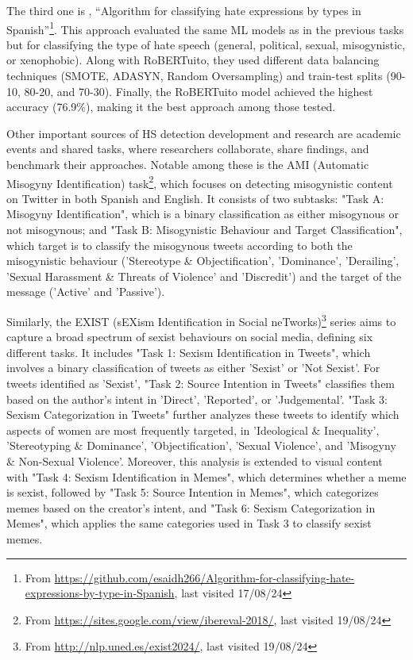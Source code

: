 The third one is \cite{perez-2024}, “Algorithm for classifying hate expressions by types in Spanish”\footnote{From \url{https://github.com/esaidh266/Algorithm-for-classifying-hate-expressions-by-type-in-Spanish}, last visited 17/08/24}. This approach evaluated the same ML models as in the previous tasks but for classifying the type of hate speech (general, political, sexual, misogynistic, or xenophobic). Along with RoBERTuito, they used different data balancing techniques (SMOTE, ADASYN, Random Oversampling) and train-test splits (90-10, 80-20, and 70-30). Finally, the RoBERTuito model achieved the highest accuracy (76.9\%), making it the best approach among those tested.

Other important sources of HS detection development and research are academic events and shared tasks, where researchers collaborate, share findings, and benchmark their approaches. Notable among these is the AMI (Automatic Misogyny Identification) task\footnote{From \url{https://sites.google.com/view/ibereval-2018/}, last visited 19/08/24}, which focuses on detecting misogynistic content on Twitter in both Spanish and English. It consists of two subtasks: "Task A: Misogyny Identification", which is a binary classification as either misogynous or not misogynous; and "Task B: Misogynistic Behaviour and Target Classification", which target is to classify the misogynous tweets according to both the misogynistic behaviour ('Stereotype \& Objectification', 'Dominance', 'Derailing', 'Sexual Harassment \& Threats of Violence' and 'Discredit') and the target of the message ('Active' and 'Passive').

Similarly, the EXIST (sEXism Identification in Social neTworks)\footnote{From \url{http://nlp.uned.es/exist2024/}, last visited 19/08/24} series aims to capture a broad spectrum of sexist behaviours on social media, defining six different tasks. It includes "Task 1: Sexism Identification in Tweets", which involves a binary classification of tweets as either 'Sexist' or 'Not Sexist'. For tweets identified as 'Sexist', "Task 2: Source Intention in Tweets" classifies them based on the author's intent in 'Direct', 'Reported', or 'Judgemental'. "Task 3: Sexism Categorization in Tweets" further analyzes these tweets to identify which aspects of women are most frequently targeted, in 'Ideological \& Inequality', 'Stereotyping \& Dominance', 'Objectification', 'Sexual Violence', and 'Misogyny \& Non-Sexual Violence'. Moreover, this analysis is extended to visual content with "Task 4: Sexism Identification in Memes", which determines whether a meme is sexist, followed by "Task 5: Source Intention in Memes", which categorizes memes based on the creator's intent, and "Task 6: Sexism Categorization in Memes", which applies the same categories used in Task 3 to classify sexist memes.

